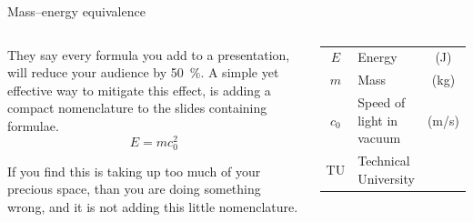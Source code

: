 \documentclass[t, aspectratio=169, english, table]{_style/tudelft-beamer}
\begin{document}
\begin{frame}{Mass--energy equivalence}
  \begin{columns}[T]
    \begin{textcolumn}
      They say every formula you add to a presentation, will reduce your audience
      by \SI{50}{\percent}. A simple yet effective way to mitigate this effect,
      is adding a compact nomenclature to the slides containing formulae.
      \[E=mc_0^2\]
      
      If you find this is taking up too much of your precious space,
      than you are doing something wrong, and it is not adding this little nomenclature.
      
    \end{textcolumn}
    \begin{textcolumn}
      \color{white}
      \begin{tabular}{cp{7em}c}
        $E$ & Energy & (\unit{J}) \\
        $m$ & Mass & (\unit{kg}) \\
        $c_0$ & Speed of light in vacuum & (\unit{m/s})\\
        TU &  Technical University
      \end{tabular}
    \end{textcolumn}
  \end{columns}
\end{frame}


\setlength{\splitpos}{-0.3\paperwidth}
\end{document}
